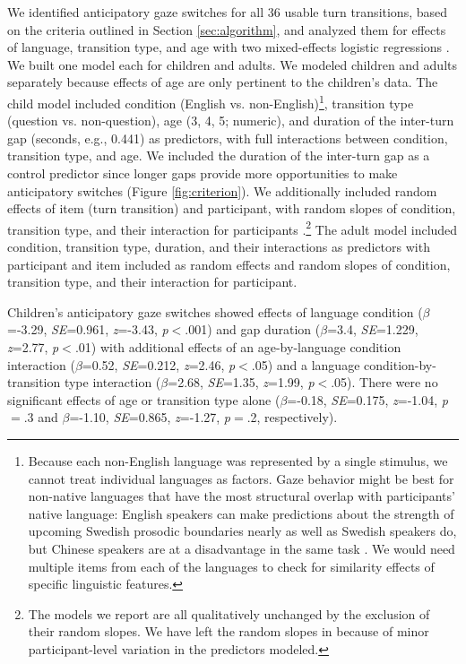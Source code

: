 \documentclass[authoryear, 12pt]{elsarticle}
\begin{document}
We identified anticipatory gaze switches for all 36 usable turn transitions, based on the criteria outlined in Section \ref{sec:algorithm}, and analyzed them for effects of language, transition type, and age with two mixed-effects logistic regressions \citep{lme4, R}. We built one model each for children and adults. We modeled children and adults separately because effects of age are only pertinent to the children's data. The child model included condition (English vs. non-English)\footnote{Because each non-English language was represented by a single stimulus, we cannot treat individual languages as factors. Gaze behavior might be best for non-native languages that have the most structural overlap with participants' native language: English speakers can make predictions about the strength of upcoming Swedish prosodic boundaries nearly as well as Swedish speakers do, but Chinese speakers are at a disadvantage in the same task \citep{carlson2005}. We would need multiple items from each of the languages to check for similarity effects of specific linguistic features.}, transition type (question vs. non-question), age (3, 4, 5; numeric), and duration of the inter-turn gap (seconds, e.g., 0.441) as predictors, with full interactions between condition, transition type, and age.  We included the duration of the inter-turn gap as a control predictor since longer gaps provide more opportunities to make anticipatory switches (Figure \ref{fig:criterion}). We additionally included random effects of item (turn transition) and participant, with random slopes of condition, transition type, and their interaction for participants \citep{barr2013}.\footnote{The models we report are all qualitatively unchanged by the exclusion of their random slopes. We have left the random slopes in because of minor participant-level variation in the predictors modeled.} The adult model included condition, transition type, duration, and their interactions as predictors with participant and item included as random effects and random slopes of condition, transition type, and their interaction for participant.

Children's anticipatory gaze switches showed effects of language condition (\textit{$\beta$}=-3.29, \textit{SE}=0.961, \textit{z}=-3.43, \textit{p}$<$.001) and gap duration (\textit{$\beta$}=3.4, \textit{SE}=1.229, \textit{z}=2.77, \textit{p}$<$.01) with additional effects of an age-by-language condition interaction (\textit{$\beta$}=0.52, \textit{SE}=0.212, \textit{z}=2.46, \textit{p}$<$.05) and a language condition-by-transition type interaction (\textit{$\beta$}=2.68, \textit{SE}=1.35, \textit{z}=1.99, \textit{p}$<$.05). There were no significant effects of age or transition type alone (\textit{$\beta$}=-0.18, \textit{SE}=0.175, \textit{z}=-1.04, \textit{p}$=$.3 and \textit{$\beta$}=-1.10, \textit{SE}=0.865, \textit{z}=-1.27, \textit{p}$=$.2, respectively). 
\end{document}
